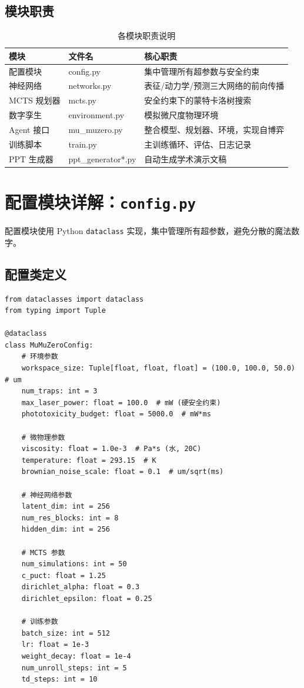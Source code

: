 \documentclass[UTF8, a4paper]{ctexart}
\begin{document}
\subsection{模块职责}

\begin{table}[H]
\centering
\caption{各模块职责说明}
\begin{tabular}{@{}lll@{}}
\toprule
\textbf{模块} & \textbf{文件名} & \textbf{核心职责} \\
\midrule
配置模块 & config.py & 集中管理所有超参数与安全约束 \\
神经网络 & networks.py & 表征/动力学/预测三大网络的前向传播 \\
MCTS 规划器 & mcts.py & 安全约束下的蒙特卡洛树搜索 \\
数字孪生 & environment.py & 模拟微尺度物理环境 \\
Agent 接口 & mu\_muzero.py & 整合模型、规划器、环境，实现自博弈 \\
训练脚本 & train.py & 主训练循环、评估、日志记录 \\
PPT 生成器 & ppt\_generator*.py & 自动生成学术演示文稿 \\
\bottomrule
\end{tabular}
\end{table}

\newpage
\section{配置模块详解：\texttt{config.py}}

配置模块使用 Python \texttt{dataclass} 实现，集中管理所有超参数，避免分散的魔法数字。

\subsection{配置类定义}

\begin{lstlisting}
from dataclasses import dataclass
from typing import Tuple

@dataclass
class MuMuZeroConfig:
    # 环境参数
    workspace_size: Tuple[float, float, float] = (100.0, 100.0, 50.0)  # um
    num_traps: int = 3
    max_laser_power: float = 100.0  # mW (硬安全约束)
    phototoxicity_budget: float = 5000.0  # mW*ms
    
    # 微物理参数
    viscosity: float = 1.0e-3  # Pa*s (水, 20C)
    temperature: float = 293.15  # K
    brownian_noise_scale: float = 0.1  # um/sqrt(ms)
    
    # 神经网络参数
    latent_dim: int = 256
    num_res_blocks: int = 8
    hidden_dim: int = 256
    
    # MCTS 参数
    num_simulations: int = 50
    c_puct: float = 1.25
    dirichlet_alpha: float = 0.3
    dirichlet_epsilon: float = 0.25
    
    # 训练参数
    batch_size: int = 512
    lr: float = 1e-3
    weight_decay: float = 1e-4
    num_unroll_steps: int = 5
    td_steps: int = 10
\end{lstlisting}
\end{document}
